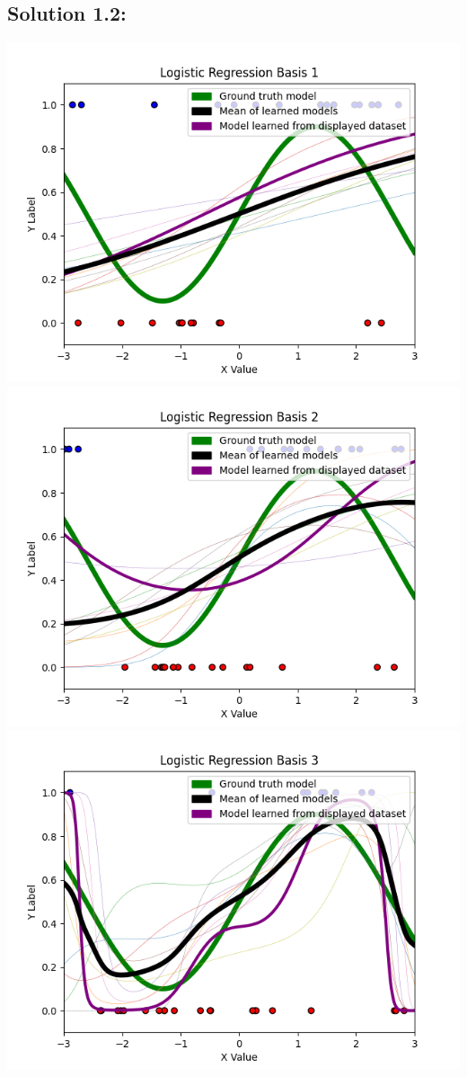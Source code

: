 \documentclass[submit]{harvardml}
\begin{document}
\subsection*{Solution 1.2:}
\begin{center}
    \includegraphics[scale = 0.75]{Logistic Regression Basis 1.png} \\
\includegraphics[scale = 0.75]{Logistic Regression Basis 2.png} \\
\includegraphics[scale = 0.75]{Logistic Regression Basis 3.png}

\end{center}
\end{document}
